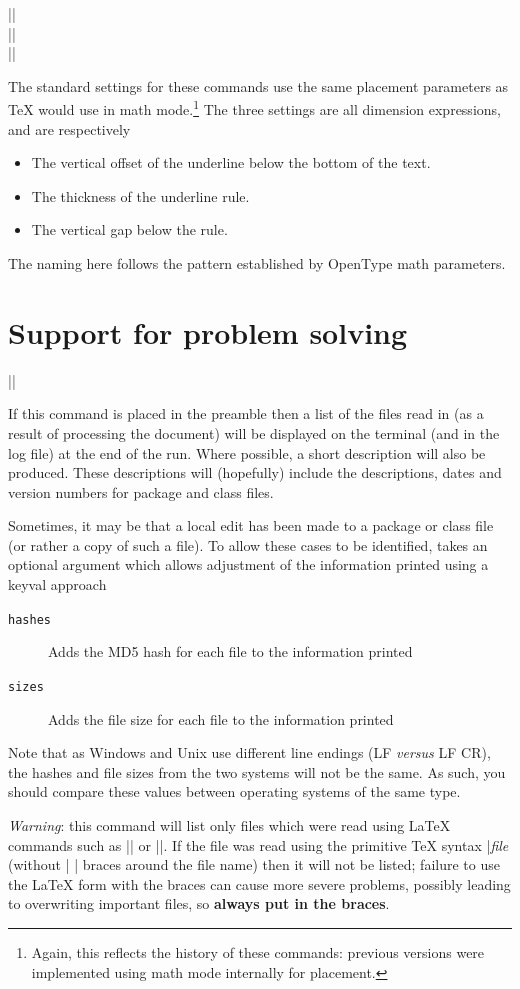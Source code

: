 \documentclass{ltxguide}
\begin{document}
\begin{decl}
  |\underline@text@vgap|    \\
  |\underline@text@thickness| \\
  |\underline@text@kern|
\end{decl}
The standard settings for these commands use the same placement parameters as
\TeX{} would use in math mode.\footnote{Again, this reflects the history of
these commands: previous versions were implemented using math mode internally
for placement.} The three settings are all dimension expressions, and are
respectively
\begin{itemize}
  \item The vertical offset of the underline below the bottom of the text.
  \item The thickness of the underline rule.
  \item The vertical gap below the rule.
\end{itemize}
The naming here follows the pattern established by OpenType math parameters.

\section{Support for problem solving}

\begin{decl}
  |\listfiles| 
\end{decl}

If this command is placed in the preamble then a list of the files
read in (as a result of processing the document) will be displayed
on the terminal (and in the log file) at the end of the run. Where
possible, a short description will also be produced. These descriptions
will (hopefully) include the descriptions, dates and version numbers
for package and class files.

Sometimes, it may be that a local edit has been made to a package or
class file (or rather a copy of such a file). To allow these cases to
be identified,  takes an optional argument which allows
adjustment of the information printed using a keyval approach
\begin{description}
  \item[\texttt{hashes}] Adds the MD5 hash for each file to the
    information printed
  \item[\texttt{sizes}] Adds the file size for each file to the
    information printed
\end{description}
Note that as Windows and Unix use different line endings (LF \emph{versus} LF
CR), the hashes and file sizes from the two systems will not be the same. As
such, you should compare these values between operating systems of the same
type.

\emph{Warning}: this command will list only files which were read
using \LaTeX{} commands such as || or
||.  If the file was read using the primitive \TeX{}
syntax |\emph{file} (without |{ }| braces around the file name)
then it will not be listed; failure to use the \LaTeX{} form with the
braces can cause more severe problems, possibly leading to overwriting
important files, so \textbf{always put in the braces}.
\end{document}
